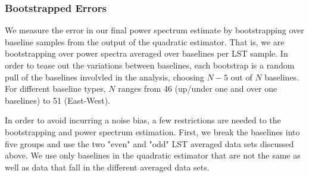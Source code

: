 \documentclass[twocolumn,numberedappendix]{emulateapj} \shorttitle{PSA64}
\begin{document}


%

\subsubsection{Bootstrapped Errors}
We measure the error in our final power spectrum estimate by bootstrapping over
baseline samples from the output of the quadratic estimator. That is, we are
bootstrapping over power spectra averaged over baselines per LST sample. In order
to tease out the variations between baselines, each bootstrap is a random pull
of the baselines involvled in the analysis, choosing $N-5$ out of $N$
baselines. For different baseline types, $N$ ranges from 46 (up/under one and
over one baselines) to 51 (East-West). 

In order to avoid incurring a noise bias, a few restrictions are needed to the
bootstrapping and power spectrum estimation. First, we break the baselines into
five groups and use the two "even" and "odd" LST averaged data sets discussed
above. We use only baselines in the quadratic estimator that are not the same
as well as data that fall in the different averaged data sets.
\end{document}
